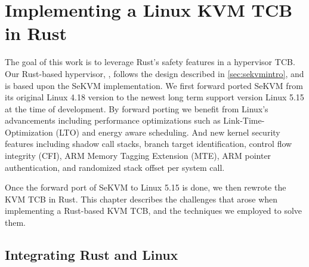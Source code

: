 \chapter{Implementing a Linux KVM TCB in Rust}
\label{sec:rewrite}


The goal of this work is to leverage Rust's safety features in a hypervisor TCB.
Our Rust-based hypervisor, \rustsec{}, follows the design described in
\autoref{sec:sekvmintro}, and is based upon the SeKVM implementation.
We first forward ported SeKVM from its original
Linux 4.18 version to the newest long term support version Linux 5.15 at the
time of development.
By forward porting we benefit from Linux's advancements including performance
optimizations such as Link-Time-Optimization (LTO) and energy aware scheduling.
And new kernel security features including  shadow call stacks,
branch target identification, control flow integrity (CFI), ARM Memory Tagging
Extension (MTE), ARM pointer authentication, and randomized stack offset per
system call.


Once the forward port of SeKVM to Linux 5.15 is done, we then rewrote
the KVM TCB in Rust.
This chapter describes the challenges that arose when implementing a
Rust-based KVM TCB, and the techniques we employed to solve them.

\section{Integrating Rust and Linux}

%

